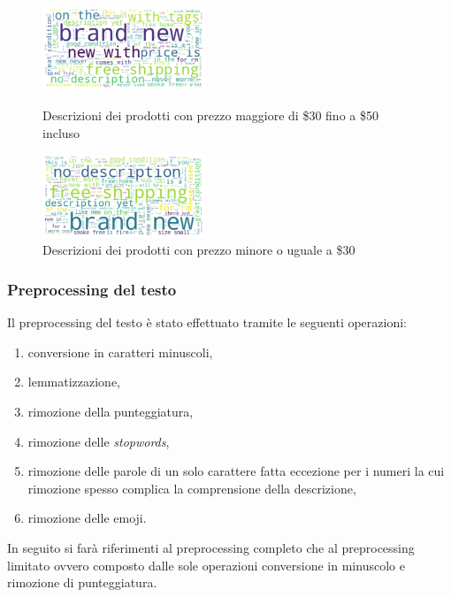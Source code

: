 \begin{figure}[H]
   \begin{minipage}{0.48\textwidth}
     \centering
     \includegraphics[height=2.5cm, keepaspectratio]{30_50}
	\caption{Descrizioni dei prodotti con prezzo maggiore di \$30 fino a \$50 incluso}
	\label{fig:30_50}   
	\end{minipage}\hfill
   \begin{minipage}{0.48\textwidth}
     \centering
     \includegraphics[height=2.5cm, keepaspectratio]{minore_30}
     \caption{Descrizioni dei prodotti con prezzo minore o uguale a \$30}
     \label{Fig:minore_30}
   \end{minipage}
\end{figure}

\subsubsection{Preprocessing del testo}

Il preprocessing del testo è stato effettuato tramite le seguenti operazioni:
\begin{enumerate}
    \item conversione in caratteri minuscoli,
    \item lemmatizzazione,
    \item rimozione della punteggiatura,
    \item rimozione delle \textit{stopwords},
    \item rimozione delle parole di un solo carattere fatta eccezione per i
    numeri la cui rimozione spesso complica la comprensione della descrizione,
    \item rimozione delle emoji.
\end{enumerate}

In seguito si farà riferimenti al preprocessing completo che al preprocessing
limitato ovvero composto dalle sole operazioni conversione in minuscolo e
rimozione di punteggiatura.

